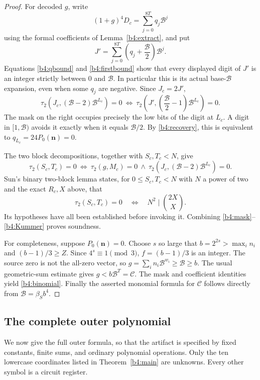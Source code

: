 \begin{proof}
For decoded $g$, write
\[
 (1+g)^4D_c
 =\sum_{j=0}^{8T}q_j\mathcal B^j
\]
using the formal coefficients of Lemma~\ref{b4:extract}, and put
\[
 J'=\sum_{j=0}^{8T}
          \left(q_j+\frac{\mathcal B}{2}\right)\mathcal B^j.
\]
Equations \eqref{b4:qbound} and \eqref{b4:firstbound} show that
every displayed digit of $J'$ is an integer strictly between
$0$ and $\mathcal B$.  In particular this is its actual
base-$\mathcal B$ expansion, even when some $q_j$ are negative.
Since $J_c=2J'$,
\[
 \tau_2(J_c,(\mathcal B-2)\mathcal B^{L_c})=0
 \ \Longleftrightarrow\
 \tau_2\!\left(J',
       \left(\frac{\mathcal B}{2}-1\right)\mathcal B^{L_c}\right)=0.
\]
The mask on the right occupies precisely the low bits of the
digit at $L_c$.  A digit in $[1,\mathcal B)$ avoids it exactly
when it equals $\mathcal B/2$.  By \eqref{b4:recovery}, this is
equivalent to $q_{L_c}=24P_0(\mathbf n)=0$.

The two block decompositions, together with $S_c,T_c<N$, give
\[
 \tau_2(S_c,T_c)=0
 \ \Longleftrightarrow\
 \tau_2(g,M_c)=0
 \ \land\
 \tau_2(J_c,(\mathcal B-2)\mathcal B^{L_c})=0.
 \tag{B4.11}\label{b4:blocksplit}
\]
Sun's binary two-block lemma \cite[Lemma~2.2]{Sun2021} states,
for $0\le S_c,T_c<N$ with $N$ a power of two and the exact
$R_c,X$ above, that
\[
 \tau_2(S_c,T_c)=0
 \quad\Longleftrightarrow\quad
 N^2\mid\binom{2X}{X}.
 \tag{B4.12}\label{b4:Kummer}
\]
Its hypotheses have all been established before invoking it.
Combining \eqref{b4:mask}--\eqref{b4:Kummer} proves soundness.

For completeness, suppose $P_0(\mathbf n)=0$.  Choose $s$ so large
that $b=2^{2s}>\max_i n_i$ and $(b-1)/3\ge Z$.  Since
$4^s\equiv1\pmod3$, $f=(b-1)/3$ is an integer.  The source
zero is not the all-zero vector, so
$g=\sum_i n_i\mathcal B^{w_i}\ge\mathcal B\ge b$.
The usual geometric-sum estimate gives $g<b\mathcal B^T=\mathscr C$.
The mask and coefficient identities yield
\eqref{b4:binomial}.  Finally the asserted monomial formula for
$\mathscr C$ follows directly from $\mathcal B=\beta_Sb^4$.
\end{proof}

\subsection{The complete outer polynomial}
\label{b4:outer}

We now give the full outer formula, so that the artifact is specified
by fixed constants, finite sums, and ordinary polynomial operations.
Only the ten lowercase coordinates listed in
Theorem~\ref{b4:main} are unknowns.  Every other symbol is a circuit
register.

